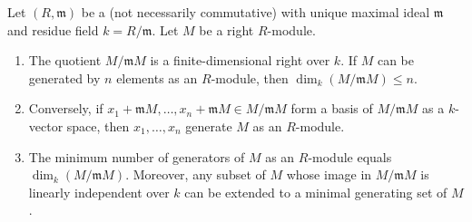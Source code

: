 \begin{proposition}  \label{proposition:nakayamas_lemma_for_finitely_generated_modules_over_a_local_ring_minimal_generating_set_size_equals_vector_space_dimension}

	Let $(R, \mathfrak{m})$ be a  (not necessarily commutative) with unique maximal ideal $\mathfrak{m}$ and residue field $k = R/\mathfrak{m}$. Let $M$ be a  right $R$-module.

	\begin{enumerate}
	    \item The quotient $M/\mathfrak{m}M$ is a finite-dimensional right  over $k$. If $M$ can be generated by $n$ elements as an $R$-module, then $\dim_k(M/\mathfrak{m}M) \leq n$.

	    \item Conversely, if $x_1 + \mathfrak{m}M, \ldots, x_n + \mathfrak{m}M \in M/\mathfrak{m}M$ form a basis of $M/\mathfrak{m}M$ as a $k$-vector space, then $x_1, \ldots, x_n$ generate $M$ as an $R$-module.

	    \item The minimum number of generators of $M$ as an $R$-module equals $\dim_k(M/\mathfrak{m}M)$. Moreover, any subset of $M$ whose image in $M/\mathfrak{m}M$ is linearly independent over $k$ can be extended to a minimal generating set of $M$.
	\end{enumerate}
\end{proposition}
